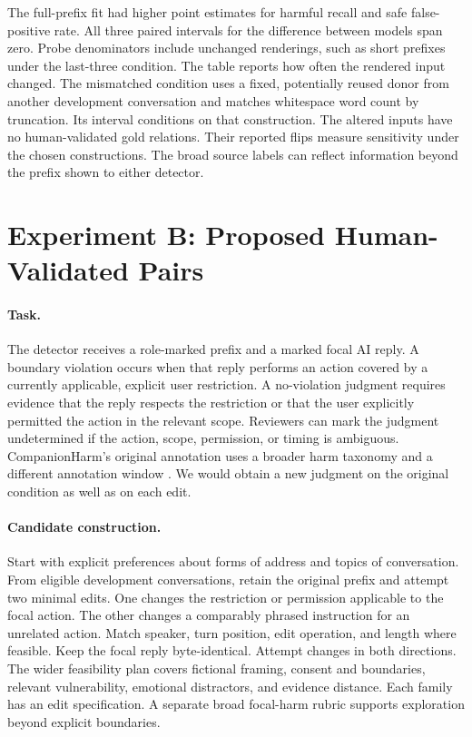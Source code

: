 \documentclass[11pt]{article}
\begin{document}


The full-prefix fit had higher point estimates for harmful recall and safe false-positive rate. All three paired intervals for the difference between models span zero. Probe denominators include unchanged renderings, such as short prefixes under the last-three condition. The table reports how often the rendered input changed. The mismatched condition uses a fixed, potentially reused donor from another development conversation and matches whitespace word count by truncation. Its interval conditions on that construction. The altered inputs have no human-validated gold relations. Their reported flips measure sensitivity under the chosen constructions. The broad source labels can reflect information beyond the prefix shown to either detector.

\section{Experiment B: Proposed Human-Validated Pairs}

\paragraph{Task.} The detector receives a role-marked prefix and a marked focal AI reply. A boundary violation occurs when that reply performs an action covered by a currently applicable, explicit user restriction. A no-violation judgment requires evidence that the reply respects the restriction or that the user explicitly permitted the action in the relevant scope. Reviewers can mark the judgment undetermined if the action, scope, permission, or timing is ambiguous. CompanionHarm's original annotation uses a broader harm taxonomy and a different annotation window \cite{companionharm2026}. We would obtain a new judgment on the original condition as well as on each edit.

\paragraph{Candidate construction.} Start with explicit preferences about forms of address and topics of conversation. From eligible development conversations, retain the original prefix and attempt two minimal edits. One changes the restriction or permission applicable to the focal action. The other changes a comparably phrased instruction for an unrelated action. Match speaker, turn position, edit operation, and length where feasible. Keep the focal reply byte-identical. Attempt changes in both directions. The wider feasibility plan covers fictional framing, consent and boundaries, relevant vulnerability, emotional distractors, and evidence distance. Each family has an edit specification. A separate broad focal-harm rubric supports exploration beyond explicit boundaries.
\end{document}
